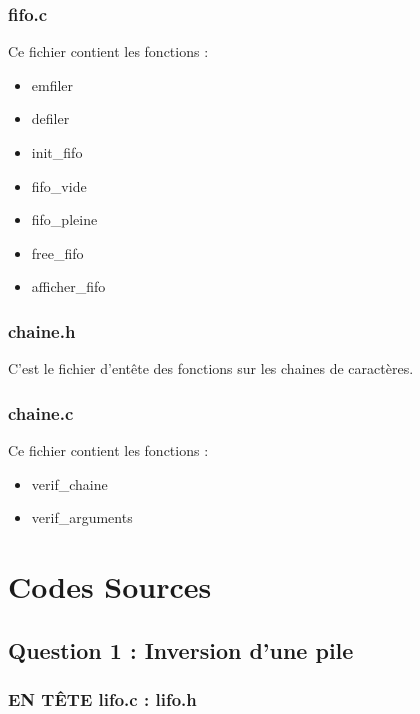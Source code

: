 \documentclass{report}
\newenvironment{myindentpar}[1]%
    {\begin{list}{}%
             {\setlength{\leftmargin}{#1}}%
             \item[]%
     }
     {\end{list}}
\begin{document}
\subsubsection{fifo.c}
Ce fichier contient les fonctions :
\begin{myindentpar}{2cm}
\begin{itemize}
    \item emfiler
    \item defiler
    \item init\_fifo
    \item fifo\_vide
    \item fifo\_pleine
    \item free\_fifo
    \item afficher\_fifo
\end{itemize}
\end{myindentpar}

\subsubsection{chaine.h}
C'est le fichier d'entête des fonctions sur les chaines de caractères.

\subsubsection{chaine.c}
Ce fichier contient les fonctions :
\begin{myindentpar}{2cm}
\begin{itemize}
    \item verif\_chaine
    \item verif\_arguments
\end{itemize}
\end{myindentpar}

\newpage
\section{Codes Sources}\label{codes}
\subsection{Question 1 : Inversion d'une pile}

\subsubsection{EN TÊTE lifo.c : lifo.h}
\begin{small}

\end{small}
\end{document}
